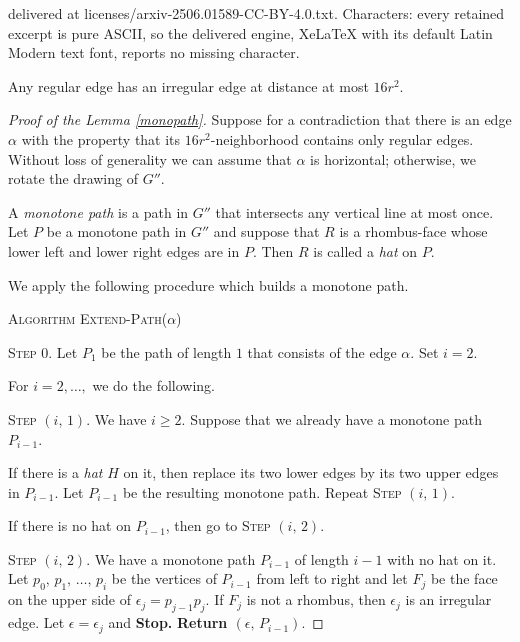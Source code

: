 \documentclass[10pt,a4paper]{amsart}
\begin{document}
delivered at licenses/arxiv-2506.01589-CC-BY-4.0.txt. Characters: every retained excerpt is pure ASCII, so the delivered engine, XeLaTeX with its default Latin Modern text font, reports no missing character.
\begin{lemma}\label{monopath}
Any regular edge has an irregular edge at distance at most $16r^2$.
\end{lemma} 

\begin{proof}[Proof of the Lemma \ref{monopath}]
Suppose for a contradiction that there is an edge $\alpha$ 
with the property that its $16r^2$-neighborhood contains only regular edges. Without loss of generality we can assume that $\alpha$ is horizontal; otherwise, we rotate the drawing of $G''$.
\smallskip

A \emph{monotone path} is a path in $G''$ that intersects any vertical line at most once. 
Let $P$ be a monotone path in $G''$ and suppose that $R$ is a 
rhombus-face whose lower left and lower right edges are in $P$. Then $R$ is called a \emph{hat} on $P$. 
\smallskip

We apply the following procedure which builds a monotone path.

\bigskip


\textsc{Algorithm Extend-Path($\alpha$)}

\smallskip

\noindent \textsc{Step $0$.} Let $P_1$ be the path of length $1$ that consists of the edge $\alpha$.
Set $i=2$.


\smallskip

For $i=2, \ldots, $ we do the following.

\noindent \textsc{Step $(i, \, 1)$}. We have $i\ge 2$. 
Suppose that we already have a monotone path $P_{i-1}$.

If there is a \emph{hat} $H$ on it, then replace its two lower edges by its two upper edges in $P_{i-1}$. Let $P_{i-1}$ be the resulting monotone path.
Repeat \textsc{Step $(i, \, 1)$}.

If there is no hat on $P_{i-1}$, then go to \textsc{Step $(i, \, 2)$}.

\smallskip

\noindent \textsc{Step $(i, \, 2)$}. We have a monotone path $P_{i-1}$ of length $i-1$ with no hat on it.
Let $p_0, \, p_1, \, \ldots, \, p_i$ be the vertices of $P_{i-1}$ from left to right and let $F_j$ be the face on the upper side of 
$\epsilon_j=p_{j-1}p_j$. If $F_j$ is not a rhombus, then $\epsilon_j$ is an irregular edge. Let $\epsilon=\epsilon_j$ and {\textbf{Stop.}} \textbf{Return $(\epsilon, \, P_{i-1})$}.


\end{proof}
\end{document}
